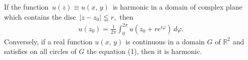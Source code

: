 \documentclass[12pt]{article}
\begin{document}
If the function \,$u(z) \equiv u(x,\,y)$\, is harmonic in a domain of complex plane which contains the disc \,$|z-z_0| \leqq r$, \,then 
\begin{align}
    u(z_0) = \frac{1}{2\pi}\int_0^{2\pi}u(z_0+re^{i\varphi})\,d\varphi.
\end{align}
Conversely, if a real function $u(x,\,y)$ is continuous in a domain $G$ of $\mathbb{R}^2$ and satisfies on all circles of $G$ the equation (1), then it is harmonic.
\end{document}
